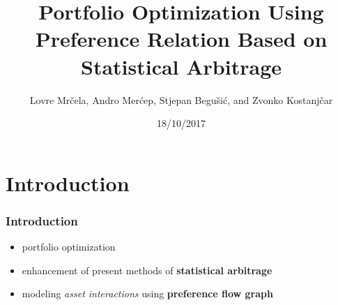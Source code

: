 \documentclass[11pt]{beamer}
\newcommand{\q}{\left}
\newcommand{\w}{\right}
\newcommand{\prob}[1]{\operatorname{\mathbf{P} \q(#1\w)}}
\renewcommand{\alert}{\textbf}
\begin{document}
  \author{Lovre Mrčela, Andro Merćep, Stjepan Begušić, and Zvonko Kostanjčar}
  \title{Portfolio Optimization Using Preference Relation Based on Statistical Arbitrage}
  \date{18/10/2017}

  \begin{frame}[plain]
  \maketitle
  \end{frame}

%  
  \section{Introduction}
  \begin{frame}
    \frametitle{Introduction}
    \begin{itemize}
    \item portfolio optimization
    \item enhancement of present methods of \alert{statistical arbitrage}
    \item modeling \emph{asset interactions} using \alert{preference flow graph}
    \end{itemize}
  \end{frame}

\end{document}
